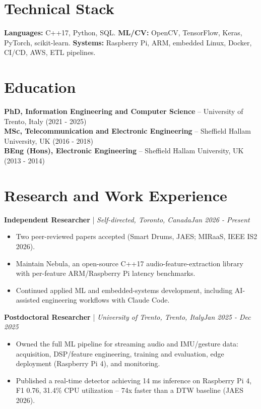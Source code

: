\documentclass[11pt]{article}
\newenvironment{cvrole}[5]{%
  \par\noindent\textbf{\large #1} | \textit{\small #2, #3}\hfill \textit{\small #4 - #5}\par
  \begin{itemize}[leftmargin=2em, itemsep=-0.3em, topsep=-0.5em]%
}{%
  \end{itemize}\par\noindent\mbox{}\par\vspace{0.1em}%
}
\begin{document}
\section*{Technical Stack}
\textbf{Languages:} C++17, Python, SQL. \quad
\textbf{ML/CV:} OpenCV, TensorFlow, Keras, PyTorch, scikit-learn. \quad
\textbf{Systems:} Raspberry Pi, ARM, embedded Linux, Docker, CI/CD, AWS, ETL pipelines.

\section*{Education}
\textbf{PhD, Information Engineering and Computer Science} -- University of Trento, Italy (2021 - 2025) \\
\textbf{MSc, Telecommunication and Electronic Engineering} -- Sheffield Hallam University, UK (2016 - 2018) \\
\textbf{BEng (Hons), Electronic Engineering} -- Sheffield Hallam University, UK (2013 - 2014)

\section*{Research and Work Experience}

\begin{cvrole}{Independent Researcher}{Self-directed}{Toronto, Canada}{Jan 2026}{Present}
\item Two peer-reviewed papers accepted (Smart Drums, JAES; MIRaaS, IEEE IS2 2026).
\item Maintain Nebula, an open-source C++17 audio-feature-extraction library with per-feature ARM/Raspberry Pi latency benchmarks.
\item Continued applied ML and embedded-systems development, including AI-assisted engineering workflows with Claude Code.
\end{cvrole}

\begin{cvrole}{Postdoctoral Researcher}{University of Trento}{Trento, Italy}{Jan 2025}{Dec 2025}
\item Owned the full ML pipeline for streaming audio and IMU/gesture data: acquisition, DSP/feature engineering, training and evaluation, edge deployment (Raspberry Pi 4), and monitoring.
\item Published a real-time detector achieving 14 ms inference on Raspberry Pi 4, F1 0.76, 31.4\% CPU utilization -- 74x faster than a DTW baseline (JAES 2026).
\end{cvrole}
\end{document}
